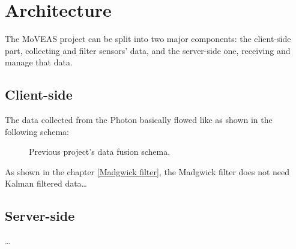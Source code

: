 \chapter{Architecture}
The MoVEAS project can be split into two major components: the client-side part, collecting and filter sensors' data, and the server-side one, receiving and manage that data.

\section{Client-side}
The data collected from the Photon basically flowed like as shown in the following schema:

\begin{center}
	\begin{figure}[ht]
		\caption{Previous project's data fusion schema.} \label{old data fusion schema}
	\end{figure}
\end{center}
\bigbreak

As shown in the chapter \ref{Madgwick filter}, the Madgwick filter does not need Kalman filtered data\dots

\section{Server-side}
\dots
